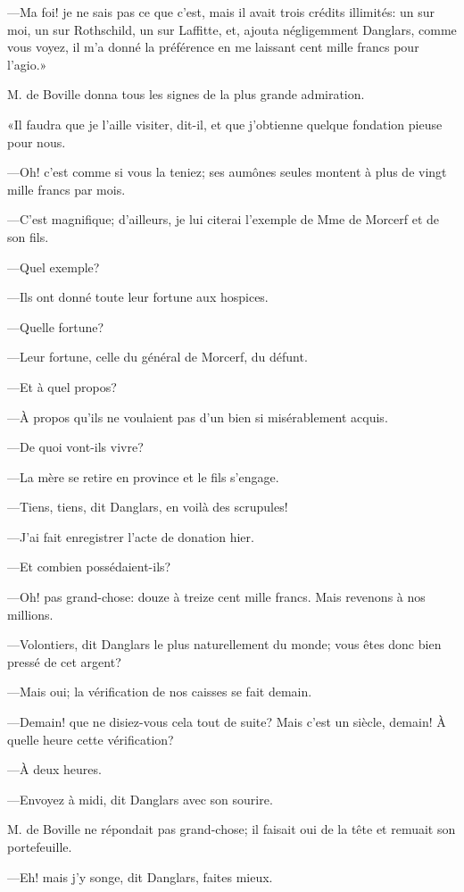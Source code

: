—Ma foi! je ne sais pas ce que c'est, mais il avait trois crédits illimités: un sur moi, un sur Rothschild, un sur Laffitte, et, ajouta négligemment Danglars, comme vous voyez, il m'a donné la préférence en me laissant cent mille francs pour l'agio.» 

M. de Boville donna tous les signes de la plus grande admiration. 

«Il faudra que je l'aille visiter, dit-il, et que j'obtienne quelque fondation pieuse pour nous. 

—Oh! c'est comme si vous la teniez; ses aumônes seules montent à plus de vingt mille francs par mois. 

—C'est magnifique; d'ailleurs, je lui citerai l'exemple de Mme de Morcerf et de son fils. 

—Quel exemple? 

—Ils ont donné toute leur fortune aux hospices. 

—Quelle fortune? 

—Leur fortune, celle du général de Morcerf, du défunt. 

—Et à quel propos? 

—À propos qu'ils ne voulaient pas d'un bien si misérablement acquis. 

—De quoi vont-ils vivre? 

—La mère se retire en province et le fils s'engage. 

—Tiens, tiens, dit Danglars, en voilà des scrupules! 

—J'ai fait enregistrer l'acte de donation hier. 

—Et combien possédaient-ils? 

—Oh! pas grand-chose: douze à treize cent mille francs. Mais revenons à nos millions. 

—Volontiers, dit Danglars le plus naturellement du monde; vous êtes donc bien pressé de cet argent? 

—Mais oui; la vérification de nos caisses se fait demain. 

—Demain! que ne disiez-vous cela tout de suite? Mais c'est un siècle, demain! À quelle heure cette vérification? 

—À deux heures. 

—Envoyez à midi, dit Danglars avec son sourire. 

M. de Boville ne répondait pas grand-chose; il faisait oui de la tête et remuait son portefeuille. 

—Eh! mais j'y songe, dit Danglars, faites mieux. 

